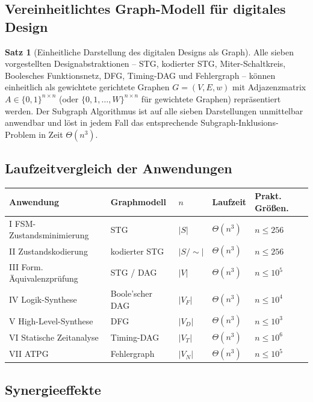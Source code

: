 ﻿\documentclass[a4paper,12pt]{article}
\theoremstyle{definition}
\newtheorem{satz}{Satz}
\begin{document}
\subsection{Vereinheitlichtes Graph-Modell für digitales Design}

\begin{satz}[Einheitliche Darstellung des digitalen Designs als Graph]\label{satz:unified}
  Alle sieben vorgestellten Designabstraktionen -- STG, kodierter STG, Miter-Schaltkreis,
  Boolesches Funktionsnetz, DFG, Timing-DAG und Fehlergraph -- können einheitlich als
  gewichtete gerichtete Graphen $G = (V, E, w)$ mit Adjazenzmatrix
  $A \in \{0,1\}^{n \times n}$ (oder $\{0,1,\ldots,W\}^{n \times n}$ für gewichtete
  Graphen) repräsentiert werden. Der Subgraph Algorithmus \cite{subgraph2026}
  ist auf alle sieben Darstellungen unmittelbar anwendbar und löst in jedem Fall das
  entsprechende Subgraph-Inklusions-Problem in Zeit $\Theta(n^3)$.
\end{satz}

\subsection{Laufzeitvergleich der Anwendungen}

\begin{center}
\begin{tabular}{lllll}
  \toprule
  Anwendung & Graphmodell & $n$ & Laufzeit & Prakt. Größen. \\
  \midrule
  I\;\; FSM-Zustandsminimierung & STG & $|S|$ & $\Theta(n^3)$ & $n \leq 256$ \\
  II\;\; Zustandskodierung & kodierter STG & $|S/{{\sim}}|$ & $\Theta(n^3)$ & $n \leq 256$ \\
  III\; Form. Äquivalenzprüfung & STG / DAG & $|V|$ & $\Theta(n^3)$ & $n \leq 10^5$ \\
  IV\;\; Logik-Synthese & Boole'scher DAG & $|V_F|$ & $\Theta(n^3)$ & $n \leq 10^4$ \\
  V\;\; High-Level-Synthese & DFG & $|V_D|$ & $\Theta(n^3)$ & $n \leq 10^3$ \\
  VI\;\; Statische Zeitanalyse & Timing-DAG & $|V_T|$ & $\Theta(n^3)$ & $n \leq 10^6$ \\
  VII\; ATPG & Fehlergraph & $|V_N|$ & $\Theta(n^3)$ & $n \leq 10^5$ \\
  \bottomrule
\end{tabular}
\end{center}

\subsection{Synergieeffekte}
\end{document}
